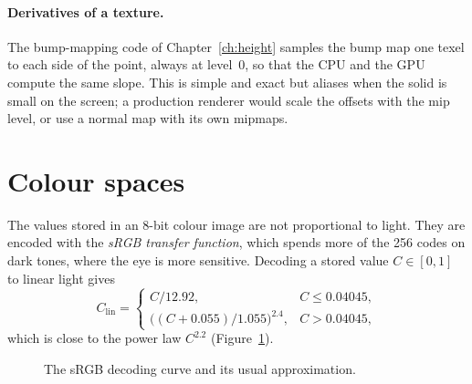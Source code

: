 \paragraph{Derivatives of a texture.} The bump-mapping code of Chapter~\ref{ch:height}
samples the bump map one texel to each side of the point, always at level~0, so that the CPU
and the GPU compute the same slope. This is simple and exact but aliases when the solid is
small on the screen; a production renderer would scale the offsets with the mip level, or use
a normal map with its own mipmaps.

\section{Colour spaces}
\label{sec:srgb}

The values stored in an 8-bit colour image are not proportional to light. They are encoded with
the \emph{sRGB transfer function}, which spends more of the 256 codes on dark tones, where the
eye is more sensitive. Decoding a stored value $C\in[0,1]$ to linear light gives
\[
  C_{\mathrm{lin}} =
  \begin{cases}
    C/12.92, & C\le 0.04045,\\[2pt]
    \bigl((C+0.055)/1.055\bigr)^{2.4}, & C>0.04045,
  \end{cases}
\]
which is close to the power law $C^{2.2}$ (Figure~\ref{fig:srgb}).

\begin{figure}[ht]
\centering
{}
\caption{The sRGB decoding curve and its usual approximation.}
\label{fig:srgb}
\end{figure}

